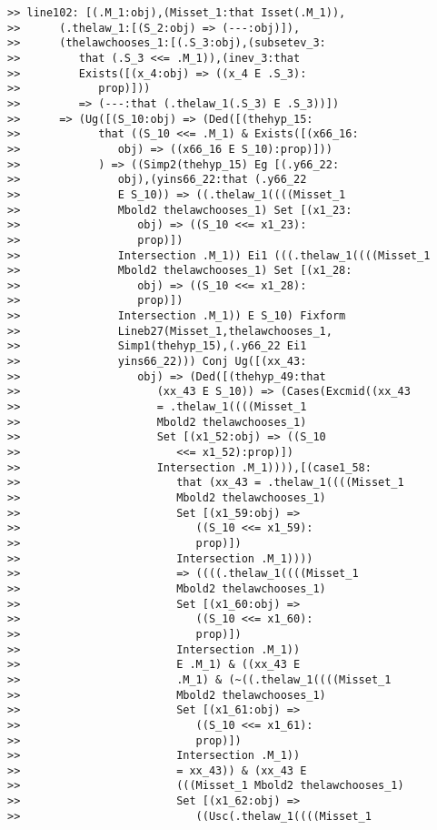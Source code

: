 \documentclass[12pt]{article}
\begin{document}
\begin{verbatim}
>> line102: [(.M_1:obj),(Misset_1:that Isset(.M_1)),
>>      (.thelaw_1:[(S_2:obj) => (---:obj)]),
>>      (thelawchooses_1:[(.S_3:obj),(subsetev_3:
>>         that (.S_3 <<= .M_1)),(inev_3:that
>>         Exists([(x_4:obj) => ((x_4 E .S_3):
>>            prop)]))
>>         => (---:that (.thelaw_1(.S_3) E .S_3))])
>>      => (Ug([(S_10:obj) => (Ded([(thehyp_15:
>>            that ((S_10 <<= .M_1) & Exists([(x66_16:
>>               obj) => ((x66_16 E S_10):prop)]))
>>            ) => ((Simp2(thehyp_15) Eg [(.y66_22:
>>               obj),(yins66_22:that (.y66_22
>>               E S_10)) => ((.thelaw_1((((Misset_1
>>               Mbold2 thelawchooses_1) Set [(x1_23:
>>                  obj) => ((S_10 <<= x1_23):
>>                  prop)])
>>               Intersection .M_1)) Ei1 (((.thelaw_1((((Misset_1
>>               Mbold2 thelawchooses_1) Set [(x1_28:
>>                  obj) => ((S_10 <<= x1_28):
>>                  prop)])
>>               Intersection .M_1)) E S_10) Fixform
>>               Lineb27(Misset_1,thelawchooses_1,
>>               Simp1(thehyp_15),(.y66_22 Ei1
>>               yins66_22))) Conj Ug([(xx_43:
>>                  obj) => (Ded([(thehyp_49:that
>>                     (xx_43 E S_10)) => (Cases(Excmid((xx_43
>>                     = .thelaw_1((((Misset_1
>>                     Mbold2 thelawchooses_1)
>>                     Set [(x1_52:obj) => ((S_10
>>                        <<= x1_52):prop)])
>>                     Intersection .M_1)))),[(case1_58:
>>                        that (xx_43 = .thelaw_1((((Misset_1
>>                        Mbold2 thelawchooses_1)
>>                        Set [(x1_59:obj) =>
>>                           ((S_10 <<= x1_59):
>>                           prop)])
>>                        Intersection .M_1))))
>>                        => ((((.thelaw_1((((Misset_1
>>                        Mbold2 thelawchooses_1)
>>                        Set [(x1_60:obj) =>
>>                           ((S_10 <<= x1_60):
>>                           prop)])
>>                        Intersection .M_1))
>>                        E .M_1) & ((xx_43 E
>>                        .M_1) & (~((.thelaw_1((((Misset_1
>>                        Mbold2 thelawchooses_1)
>>                        Set [(x1_61:obj) =>
>>                           ((S_10 <<= x1_61):
>>                           prop)])
>>                        Intersection .M_1))
>>                        = xx_43)) & (xx_43 E
>>                        (((Misset_1 Mbold2 thelawchooses_1)
>>                        Set [(x1_62:obj) =>
>>                           ((Usc(.thelaw_1((((Misset_1

\end{verbatim}
\end{document}
